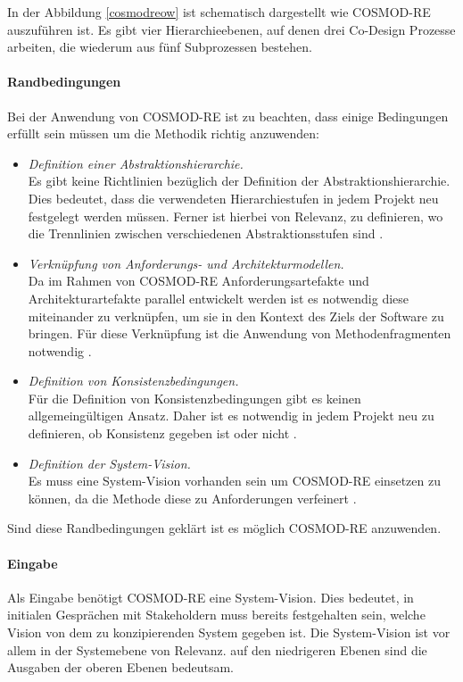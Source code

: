 In der Abbildung \ref{cosmodreow} ist schematisch dargestellt wie COSMOD-RE auszuf\"uhren ist. Es gibt vier Hierarchieebenen, auf denen drei Co-Design Prozesse arbeiten, die wiederum aus f\"unf Subprozessen bestehen.\\

\paragraph{Randbedingungen}
Bei der Anwendung von COSMOD-RE ist zu beachten, dass einige Bedingungen erf\"ullt sein m\"ussen um die Methodik richtig anzuwenden:\\

\begin{itemize}
\item \emph{Definition einer Abstraktionshierarchie.} \\
Es gibt keine Richtlinien bez\"uglich der Definition der Abstraktionshierarchie. Dies bedeutet, dass die verwendeten Hierarchiestufen in jedem Projekt neu festgelegt werden m\"ussen. Ferner ist hierbei von Relevanz, zu definieren, wo die Trennlinien zwischen verschiedenen Abstraktionsstufen sind \cite{Sik01}.
\item \emph{Verkn\"upfung von Anforderungs- und Architekturmodellen.} \\
Da im Rahmen von COSMOD-RE Anforderungsartefakte und Architekturartefakte parallel entwickelt werden ist es notwendig diese miteinander zu verkn\"upfen, um sie in den Kontext des Ziels der Software zu bringen. F\"ur diese Verkn\"upfung ist die Anwendung von Methodenfragmenten notwendig \cite{Sik01}.
\item \emph{Definition von Konsistenzbedingungen.} \\
F\"ur die Definition von Konsistenzbedingungen gibt es keinen allgemeing\"ultigen Ansatz. Daher ist es notwendig in jedem Projekt neu zu definieren, ob Konsistenz gegeben ist oder nicht \cite{Sik01}.
\item \emph{Definition der System-Vision.} \\
Es muss eine System-Vision vorhanden sein um COSMOD-RE einsetzen zu k\"onnen, da die Methode diese zu Anforderungen verfeinert \cite{Poh01}.\\
\end{itemize}

Sind diese Randbedingungen gekl\"art ist es m\"oglich COSMOD-RE anzuwenden.\\

\paragraph{Eingabe}
Als Eingabe ben\"otigt COSMOD-RE eine System-Vision. Dies bedeutet, in initialen Gespr\"achen mit Stakeholdern muss bereits festgehalten sein, welche Vision von dem zu konzipierenden System gegeben ist. Die System-Vision ist vor allem in der Systemebene von Relevanz. auf den niedrigeren Ebenen sind die Ausgaben der oberen Ebenen bedeutsam.\\

